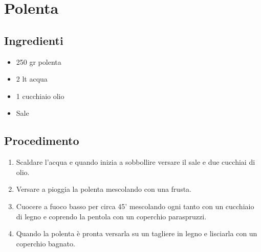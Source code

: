 \section{Polenta}
\subsection{Ingredienti}
\begin{itemize}
\item 250 gr polenta  
\item 2 lt acqua  
\item 1 cucchiaio olio  
\item Sale
\end{itemize}
\subsection{Procedimento}
\begin{enumerate}
\item  Scaldare l'acqua e quando inizia a sobbollire versare il sale e due cucchiai di olio.  
\item  Versare a pioggia la polenta mescolando con una frusta.  
\item  Cuocere a fuoco basso per circa 45' mescolando ogni tanto con un cucchiaio di legno e coprendo la pentola con un coperchio paraspruzzi.  
\item  Quando la polenta è pronta versarla su un tagliere in legno e lisciarla con un coperchio bagnato.
\end{enumerate}
